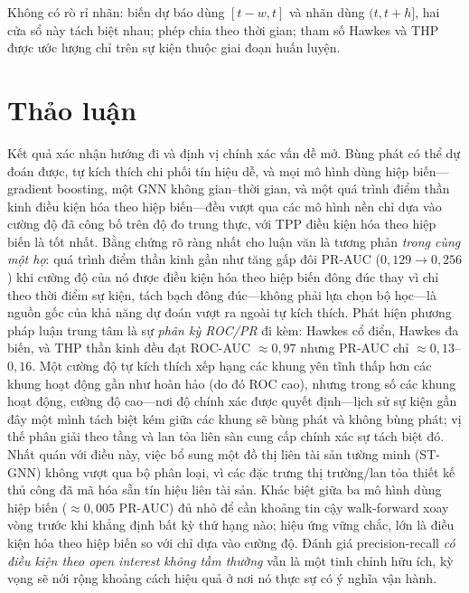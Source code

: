 \documentclass[11pt,a4paper]{article}
\begin{document}
Không có rò rỉ nhãn: biến dự báo dùng $[t-w,t]$ và nhãn dùng $(t,t+h]$, hai cửa sổ này tách biệt nhau; phép chia theo thời gian; tham số Hawkes và THP được ước lượng chỉ trên sự kiện thuộc giai đoạn huấn luyện.

\section{Thảo luận}

Kết quả xác nhận hướng đi và định vị chính xác vấn đề mở. Bùng phát có thể dự đoán được, tự kích thích chi phối tín hiệu dễ, và mọi mô hình dùng hiệp biến---gradient boosting, một GNN không gian--thời gian, và một quá trình điểm thần kinh điều kiện hóa theo hiệp biến---đều vượt qua các mô hình nền chỉ dựa vào cường độ đã công bố trên độ đo trung thực, với TPP điều kiện hóa theo hiệp biến là tốt nhất. Bằng chứng rõ ràng nhất cho luận văn là tương phản \emph{trong cùng một họ}: quá trình điểm thần kinh gần như tăng gấp đôi PR-AUC ($0{,}129\to0{,}256$) khi cường độ của nó được điều kiện hóa theo hiệp biến đông đúc thay vì chỉ theo thời điểm sự kiện, tách bạch đông đúc---không phải lựa chọn bộ học---là nguồn gốc của khả năng dự đoán vượt ra ngoài tự kích thích. Phát hiện phương pháp luận trung tâm là sự \emph{phân kỳ ROC/PR} đi kèm: Hawkes cổ điển, Hawkes đa biến, và THP thần kinh đều đạt ROC-AUC $\approx 0{,}97$ nhưng PR-AUC chỉ $\approx 0{,}13$--$0{,}16$. Một cường độ tự kích thích xếp hạng các khung yên tĩnh thấp hơn các khung hoạt động gần như hoàn hảo (do đó ROC cao), nhưng trong số các khung hoạt động, cường độ cao---nơi độ chính xác được quyết định---lịch sử sự kiện gần đây một mình tách biệt kém giữa các khung sẽ bùng phát và không bùng phát; vị thế phân giải theo tầng và lan tỏa liên sàn cung cấp chính xác sự tách biệt đó. Nhất quán với điều này, việc bổ sung một đồ thị liên tài sản tường minh (ST-GNN) không vượt qua bộ phân loại, vì các đặc trưng thị trường/lan tỏa thiết kế thủ công đã mã hóa sẵn tín hiệu liên tài sản. Khác biệt giữa ba mô hình dùng hiệp biến ($\approx 0{,}005$ PR-AUC) đủ nhỏ để cần khoảng tin cậy walk-forward xoay vòng trước khi khẳng định bất kỳ thứ hạng nào; hiệu ứng vững chắc, lớn là điều kiện hóa theo hiệp biến so với chỉ dựa vào cường độ. Đánh giá precision-recall \emph{có điều kiện theo open interest không tầm thường} vẫn là một tinh chỉnh hữu ích, kỳ vọng sẽ nới rộng khoảng cách hiệu quả ở nơi nó thực sự có ý nghĩa vận hành.
\end{document}
